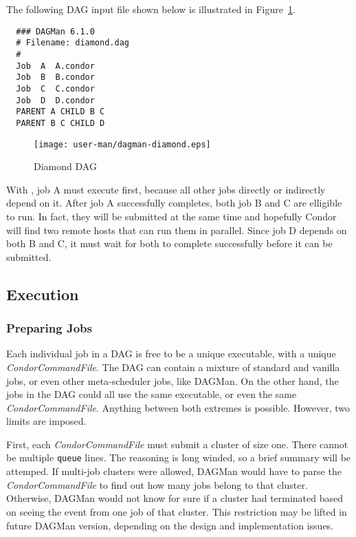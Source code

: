 The following  DAG input file shown below is illustrated in
Figure~\ref{fig:dagman-diamond}.

\begin{verbatim}
  ### DAGMan 6.1.0
  # Filename: diamond.dag
  #
  Job  A  A.condor 
  Job  B  B.condor 
  Job  C  C.condor	
  Job  D  D.condor
  PARENT A CHILD B C
  PARENT B C CHILD D
\end{verbatim}

\begin{figure}[hbt]
\centering
\texttt{[image: user-man/dagman-diamond.eps]}
\caption{\label{fig:dagman-diamond}Diamond DAG}
\end{figure}

With , job A must execute first, because all other jobs
directly or indirectly depend on it.  After job A successfully completes, both
job B and C are elligible to run.  In fact, they will be submitted at the same
time and hopefully Condor will find two remote hosts that can run them in
parallel.  Since job D depends on both B and C, it must wait for both to
complete successfully before it can be submitted.

\subsection{Execution}

\subsubsection{Preparing Jobs}
\label{dagman:prepjob}

Each individual job in a DAG is free to be a unique executable, with a unique
\textit{CondorCommandFile}.  The DAG can contain a mixture of standard and
vanilla jobs, or even other meta-scheduler jobs, like DAGMan.  On the other
hand, the jobs in the DAG could all use the same executable, or even the same
\textit{CondorCommandFile}.  Anything between both extremes is possible.
However, two limits are imposed.

First, each \textit{CondorCommandFile} must submit a cluster of size one.
There cannot be multiple \texttt{queue} lines.  The reasoning is long winded,
so a brief summary will be attemped.  If multi-job clusters were allowed,
DAGMan would have to parse the \textit{CondorCommandFile} to find out how many
jobs belong to that cluster.  Otherwise, DAGMan would not know for sure if a
cluster had terminated based on seeing the event from one job of that
cluster.  This restriction may be lifted in future DAGMan version, depending
on the design and implementation issues.

